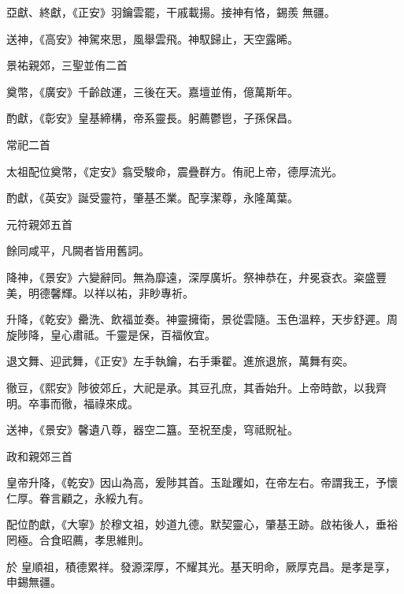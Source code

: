\begin{pinyinscope}
 亞獻、終獻，《正安》羽鑰雲罷，干戚載揚。接神有恪，錫羨
 無疆。



 送神，《高安》神駕來思，風舉雲飛。神馭歸止，天空露晞。



 景祐親郊，三聖並侑二首



 奠幣，《廣安》千齡啟運，三後在天。嘉壇並侑，億萬斯年。



 酌獻，《彰安》皇基締構，帝系靈長。躬薦鬱鬯，子孫保昌。



 常祀二首



 太祖配位奠幣，《定安》翕受駿命，震疊群方。侑祀上帝，德厚流光。



 酌獻，《英安》誕受靈符，肇基丕業。配享潔尊，永隆萬葉。



 元符親郊五首



 餘同咸平，凡闕者皆用舊詞。



 降神，《景安》六變辭同。無為靡遠，深厚廣圻。祭神恭在，弁冕袞衣。粢盛豐美，明德馨輝。以祥以祐，非眇專祈。



 升降，《乾安》罍洗、飲福並奏。神靈擁衛，景從雲隨。玉色溫粹，天步舒遲。周旋陟降，皇心肅祗。千靈是保，百福攸宜。



 退文舞、迎武舞，《正安》左手執鑰，右手秉翟。進旅退旅，萬舞有奕。



 徹豆，《熙安》陟彼郊丘，大祀是承。其豆孔庶，其香始升。上帝時歆，以我齊明。卒事而徹，福祿來成。



 送神，《景安》馨遺八尊，器空二簋。至祝至虔，穹祗貺祉。



 政和親郊三首



 皇帝升降，《乾安》因山為高，爰陟其首。玉趾躩如，在帝左右。帝謂我王，予懷仁厚。眷言顧之，永綏九有。



 配位酌獻，《大寧》於穆文祖，妙道九德。默契靈心，肇基王跡。啟祐後人，垂裕罔極。合食昭薦，孝思維則。



 於
 皇順祖，積德累祥。發源深厚，不耀其光。基天明命，厥厚克昌。是孝是享，申錫無疆。




\end{pinyinscope}
